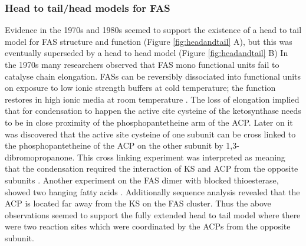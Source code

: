 			\subsubsection{Head to tail/head models for FAS}
			\label{sec:heatotail}
			Evidence in the 1970s and 1980s seemed to support the existence of a head to tail model for FAS structure and function (Figure \ref{fig:headandtail} A), but this was eventually superseded by a head to head model (Figure \ref{fig:headandtail} B)  In the 1970s many researchers observed that FAS mono functional units fail to catalyse chain elongation. FASs can be reversibly dissociated into functional units on exposure to low ionic strength buffers at cold temperature; the function restores in high ionic media at room temperature \parencite{Kumar1970,Smith1971}. The loss of elongation implied that for condensation to happen the active cite cysteine of the ketosynthase needs to be in close proximity of the phosphopantetheine arm of the ACP. Later on it was discovered that the active site cysteine of one subunit can be cross linked to the phosphopantetheine of the ACP on the other subunit by 1,3-dibromopropanone. This cross linking experiment was interpreted as meaning that the condensation required the interaction of KS and ACP from the opposite subunits \parencite{Stoops1983}. Another experiment on the FAS dimer with blocked thioesterase, showed two hanging fatty acids \parencite{Singh1984}. Additionally sequence analysis revealed that the ACP is located far away from the KS on the FAS cluster. Thus the above observations seemed to support the fully extended head to tail model where there were two reaction sites which were coordinated by the ACPs from the opposite subunit. 
		 	
